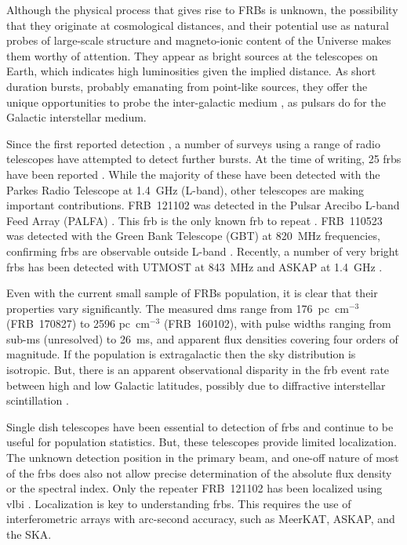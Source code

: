 \documentclass[a4paper,fleqn,usenatbib]{mnras}
\begin{document}
Although the physical process that gives rise to FRBs is unknown, the
possibility that they originate at cosmological distances, and their potential
use as natural probes of large-scale structure and magneto-ionic content of the
Universe makes them worthy of attention. They appear as bright sources at the
telescopes on Earth, which indicates high luminosities given the implied
distance.  As short duration bursts, probably emanating from point-like sources,
they offer the unique opportunities to probe the inter-galactic medium
\citep[IGM;][]{2013ApJ...776..125M}, as pulsars do for the Galactic interstellar
medium.

Since the first reported detection \citep{2007Sci...318..777L}, a number of
surveys using a range of radio telescopes have attempted to detect further
bursts. At the time of writing, 25 \glspl{frb} have been reported \citep[for an
up-to-date list, see][]{2016PASA...33...45P}. While the majority of these have
been detected with the Parkes Radio Telescope at 1.4~GHz (L-band), other
telescopes are making important contributions. FRB~121102 was detected in the
Pulsar Arecibo L-band Feed Array (PALFA) \citep{2014ApJ...790..101S}. This
\gls{frb} is the only known \gls{frb} to repeat \citep{2016ApJ...833..177S}.
FRB~110523 was detected with the Green Bank Telescope (GBT) at 820~MHz
frequencies, confirming \glspl{frb} are observable outside L-band
\citep{2015Natur.528..523M}.  Recently, a number of very bright \glspl{frb} has
been detected with UTMOST at 843~MHz
\citep{2017MNRAS.468.3746C,atel10697,atel10867} and ASKAP at 1.4~GHz
\citep{2017ApJ...841L..12B}.

Even with the current small sample of FRBs population, it is clear that their
 properties vary significantly. The measured \glspl{dm} range from
176~pc~cm$^{-3}$ (FRB~170827) to 2596 pc~cm$^{-3}$ (FRB~160102), with pulse
widths ranging from sub-ms (unresolved) to 26~ms, and apparent flux densities
covering four orders of magnitude.  If the population is extragalactic then the
sky distribution is isotropic.  But, there is an apparent observational
disparity in the \gls{frb} event rate between high and low Galactic latitudes,
possibly due to diffractive interstellar scintillation
\citep{2015MNRAS.451.3278M}.

Single dish telescopes have been essential to detection of \glspl{frb} and
continue to be useful for population statistics.  But, these telescopes provide
limited localization.  The unknown detection position in the primary beam, and
one-off nature of most of the \glspl{frb} does also not allow precise
determination of the absolute flux density or the spectral index. Only the
repeater FRB~121102 has been localized using \gls{vlbi}
\citep{2017ApJ...834L...8M, 2017ApJ...834L...7T}. Localization is key to
understanding \glspl{frb}. This requires the use of interferometric arrays with
arc-second accuracy, such as MeerKAT, ASKAP, and the SKA. 
\end{document}
